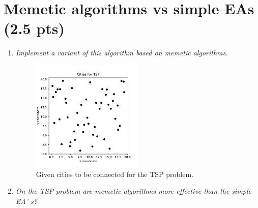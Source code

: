 \documentclass{article}
\begin{document}
\section{Memetic algorithms vs simple EAs (2.5 pts)}
\begin{enumerate}[label=\alph*)]
    \item \textit{Implement a variant of this algorithm based on memetic algorithms.} \\
    
    \begin{figure}[H]
        \centering
        \includegraphics[width=0.5\textwidth]{Assignment 1/Figures/A1_6a.pdf}
        \caption{Given cities to be connected for the TSP problem.}
        \label{fig:A1_6a}
    \end{figure}

    \item \textit{On the TSP problem are memetic algorithms more effective than the simple EA’ s? } \\
\end{enumerate}

\end{document}
